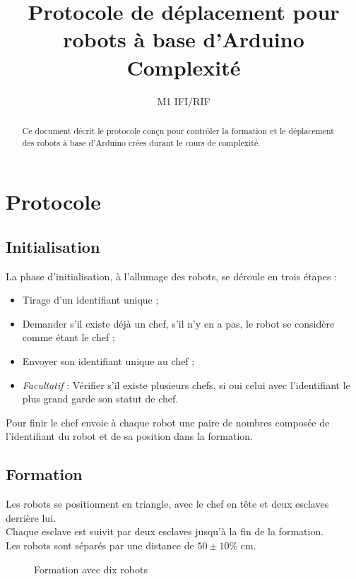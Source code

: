 \documentclass[a4paper,12pt]{article}
\title{%
        Protocole de déplacement pour robots à base d'Arduino\\
        \large Complexité
}
\author{%
        M1 IFI/RIF
}
\begin{document}
\maketitle

\begin{abstract}
        Ce document décrit le protocole conçu pour contrôler la formation et le déplacement des robots à base d'Arduino crées durant le cours de complexité.
\end{abstract}

\newpage

\section{Protocole}\label{protocole}
\subsection{Initialisation}
La phase d'initialisation, à l'allumage des robots, se déroule en trois étapes :
\begin{itemize}
        \item Tirage d'un identifiant unique ;
        \item Demander s'il existe déjà un chef, s'il n'y en a pas, le robot se considère comme étant le chef ;
        \item Envoyer son identifiant unique au chef ;
        \item \textit{Facultatif} : Vérifier s'il existe plusieurs chefs, si oui celui avec l'identifiant le plus grand garde son statut de chef.
\end{itemize}
Pour finir le chef envoie à chaque robot une paire de nombres composée de l'identifiant du robot et de sa position dans la formation.
\subsection{Formation}
Les robots se positionnent en triangle, avec le chef en tête et deux esclaves derrière lui.\\
Chaque esclave est suivit par deux esclaves jusqu'à la fin de la formation.\\
Les robots sont séparés par une distance de $50 \pm 10\%$ cm.
\begin{figure}[!h]
        \centering
        \caption{Formation avec dix robots}\label{fig:Form}
\end{figure}
\end{document}
